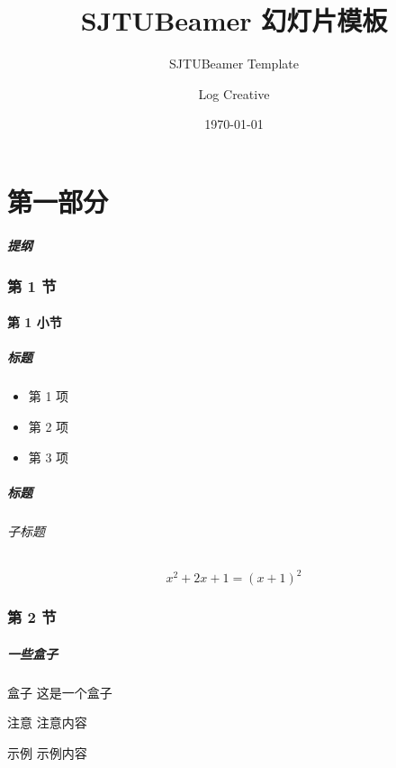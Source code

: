 \documentclass[
    aspectratio=169,                   %
]{beamer}
\institute[School of Mathematical Sciences]{数学科学学院}   %
\title{\textsf{SJTUBeamer} 幻灯片模板}  %
\subtitle{SJTUBeamer Template}         %
\author{Log Creative}                  %
\date{\today}                          %
\begin{document}
    \maketitle                         %

\part{第一部分}

    \begin{frame}
        \frametitle{提纲}
        \tableofcontents               %
    \end{frame}

\section{第 1 节}
\subsection{第 1 小节}

    \begin{frame}
        \frametitle{标题}

        \begin{itemize}
            \item 第 1 项
            \item 第 2 项
            \item 第 3 项
        \end{itemize}

    \end{frame}

    \begin{frame}
        \frametitle{标题}
        \framesubtitle{子标题}

        \begin{equation}
            x^2+2x+1=(x+1)^2
        \end{equation}
        
    \end{frame}

\section{第 2 节}
    \begin{frame}
        \frametitle{一些盒子}
        
        \begin{block}{盒子}
            这是一个盒子\cite{beamerman}
        \end{block}

        \begin{alertblock}{注意}
            注意内容
        \end{alertblock}

        \begin{exampleblock}{示例}
            示例内容
        \end{exampleblock}
    \end{frame}
\end{document}
